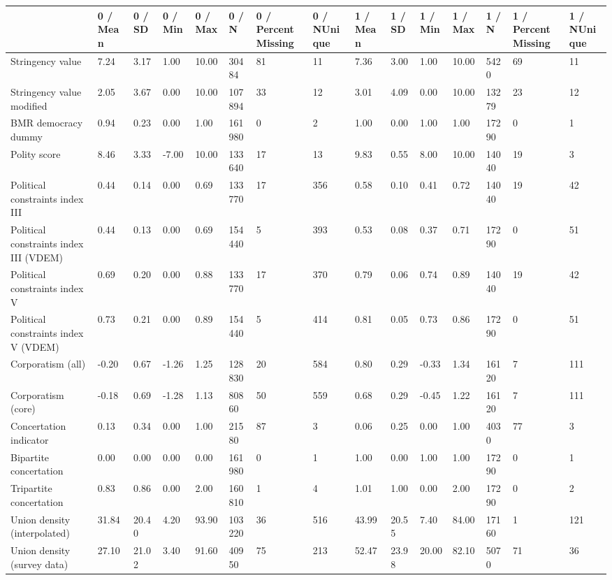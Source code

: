 
\begin{longtable}{lllllllllllllll}
\toprule
  & 0 / Mean & 0 / SD & 0 / Min & 0 / Max & 0 / N & 0 / PercentMissing & 0 / NUnique & 1 / Mean & 1 / SD & 1 / Min & 1 / Max & 1 / N & 1 / PercentMissing & 1 / NUnique\\
\midrule
Stringency value & 7.24 & 3.17 & 1.00 & 10.00 & 30484 & 81 & 11 & 7.36 & 3.00 & 1.00 & 10.00 & 5420 & 69 & 11\\
Stringency value modified & 2.05 & 3.67 & 0.00 & 10.00 & 107894 & 33 & 12 & 3.01 & 4.09 & 0.00 & 10.00 & 13279 & 23 & 12\\
BMR democracy dummy & 0.94 & 0.23 & 0.00 & 1.00 & 161980 & 0 & 2 & 1.00 & 0.00 & 1.00 & 1.00 & 17290 & 0 & 1\\
Polity score & 8.46 & 3.33 & -7.00 & 10.00 & 133640 & 17 & 13 & 9.83 & 0.55 & 8.00 & 10.00 & 14040 & 19 & 3\\
Political constraints index III & 0.44 & 0.14 & 0.00 & 0.69 & 133770 & 17 & 356 & 0.58 & 0.10 & 0.41 & 0.72 & 14040 & 19 & 42\\
\addlinespace
Political constraints index III (VDEM) & 0.44 & 0.13 & 0.00 & 0.69 & 154440 & 5 & 393 & 0.53 & 0.08 & 0.37 & 0.71 & 17290 & 0 & 51\\
Political constraints index V & 0.69 & 0.20 & 0.00 & 0.88 & 133770 & 17 & 370 & 0.79 & 0.06 & 0.74 & 0.89 & 14040 & 19 & 42\\
Political constraints index V (VDEM) & 0.73 & 0.21 & 0.00 & 0.89 & 154440 & 5 & 414 & 0.81 & 0.05 & 0.73 & 0.86 & 17290 & 0 & 51\\
Corporatism (all) & -0.20 & 0.67 & -1.26 & 1.25 & 128830 & 20 & 584 & 0.80 & 0.29 & -0.33 & 1.34 & 16120 & 7 & 111\\
Corporatism (core) & -0.18 & 0.69 & -1.28 & 1.13 & 80860 & 50 & 559 & 0.68 & 0.29 & -0.45 & 1.22 & 16120 & 7 & 111\\
\addlinespace
Concertation indicator & 0.13 & 0.34 & 0.00 & 1.00 & 21580 & 87 & 3 & 0.06 & 0.25 & 0.00 & 1.00 & 4030 & 77 & 3\\
Bipartite concertation & 0.00 & 0.00 & 0.00 & 0.00 & 161980 & 0 & 1 & 1.00 & 0.00 & 1.00 & 1.00 & 17290 & 0 & 1\\
Tripartite concertation & 0.83 & 0.86 & 0.00 & 2.00 & 160810 & 1 & 4 & 1.01 & 1.00 & 0.00 & 2.00 & 17290 & 0 & 2\\
Union density (interpolated) & 31.84 & 20.40 & 4.20 & 93.90 & 103220 & 36 & 516 & 43.99 & 20.55 & 7.40 & 84.00 & 17160 & 1 & 121\\
Union density (survey data) & 27.10 & 21.02 & 3.40 & 91.60 & 40950 & 75 & 213 & 52.47 & 23.98 & 20.00 & 82.10 & 5070 & 71 & 36\\

\end{longtable}
